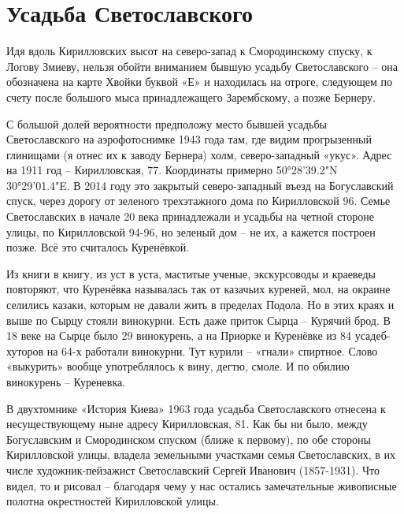 \chapter{Усадьба Светославского}

Идя вдоль Кирилловских высот на северо-запад к Смородинскому спуску, к Логову Змиеву, нельзя обойти вниманием бывшую усадьбу Светославского – она обозначена на карте Хвойки буквой «Е» и находилась на отроге, следующем по счету после большого мыса принадлежащего Зарембскому, а позже Бернеру. 

С большой долей вероятности предположу место бывшей усадьбы Светославского на аэрофотоснимке 1943 года там, где видим прогрызенный глинищами (я отнес их к заводу Бернера) холм, северо-западный «укус». Адрес на 1911 год – Кирилловская, 77. Координаты примерно 50°28'39.2"N 30°29'01.4"E. В 2014 году это закрытый северо-западный въезд на Богуславский спуск, через дорогу от зеленого трехэтажного дома по Кирилловской 96. Семье Светославских в начале 20 века принадлежали и усадьбы на четной стороне улицы, по Кирилловской 94-96, но зеленый дом – не их, а кажется построен позже. Всё это считалось Куренёвкой.

Из книги в книгу, из уст в уста, маститые ученые, экскурсоводы и краеведы повторяют, что Куренёвка называлась так от казачьих куреней, мол, на окраине селились казаки, которым не давали жить в пределах Подола. Но в этих краях и выше по Сырцу стояли винокурни. Есть даже приток Сырца – Курячий брод. В 18 веке на Сырце было 29 винокурень, а на Приорке и Куренёвке из 84 усадеб-хуторов на 64-х работали винокурни. Тут курили – «гнали» спиртное. Слово «выкурить» вообще употреблялось к вину, дегтю, смоле. И по обилию винокурень – Куреневка.

В двухтомнике «История Киева» 1963 года усадьба Светославского отнесена к несуществующему ныне адресу Кирилловская, 81. Как бы ни было, между Богуславским и Смородинском спуском (ближе к первому), по обе стороны Кирилловской улицы, владела земельными участками семья Светославских, в их числе художник-пейзажист Светославский Сергей Иванович (1857-1931). Что видел, то и рисовал – благодаря чему у нас остались замечательные живописные полотна окрестностей Кирилловской улицы.

